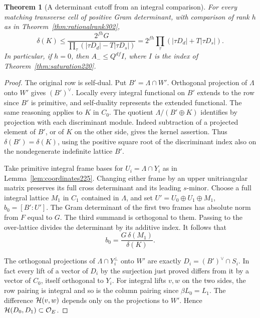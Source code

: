 \documentclass[a4paper,11pt]{article}
\newtheorem{theorem}[proposition]{Theorem}
\theoremstyle{definition}
\theoremstyle{remark}
\numberwithin{equation}{section}
\newcommand{\OO}{\mathcal O}
\begin{document}
\begin{theorem}[A determinant cutoff from an integral comparison]\leavevmode
\label{thm:agreement303}
For every matching transverse cell of positive Gram determinant,
with comparison of rank \(h\) as in Theorem~\ref{thm:rationalrank302},
\[
 \delta(K)\le
 \frac{2^{fh}G}{\prod_\tau (|\tau D_d|-T|\tau D_s|)}
     = 2^{fh}\prod_\tau (|\tau D_d|+T|\tau D_s|).
\]
In particular, if \(h=0\), then \(A_-\le Q^{df} I\), where
\(I\) is the index of Theorem~\ref{thm:saturation220}.
\end{theorem}
\begin{proof}
The original row is self-dual. Put \(B'=\Lambda\cap W'\).
Orthogonal projection of \(\Lambda\) onto \(W'\) gives
\((B')^\vee\). Locally every integral functional on \(B'\)
extends to the row since \(B'\) is primitive, and self-duality
represents the extended functional. The same reasoning
applies to \(K\) in \(C_0\). The quotient
\(\Lambda/(B'\oplus K)\) identifies by projection with each
discriminant module. Indeed subtraction of a projected
element of \(B'\), or of \(K\) on the other side, gives the
kernel assertion. Thus \(\delta(B')=\delta(K)\), using the
positive square root of the discriminant index also on the
nondegenerate indefinite lattice \(B'\).

Take primitive integral frame bases for
\(U_i=\Lambda\cap Y_i\) as in Lemma~\ref{lem:coordinates225}.
Changing either frame by an upper unitriangular matrix
preserves its full cross determinant and its leading
\(s\)-minor. Choose a full integral lattice \(M_1\) in
\(C_1\) contained in \(\Lambda\), and set
\(U'=U_0\oplus U_1\oplus M_1\), \(b_0=[B':U']\).
The Gram determinant of the first two frames has absolute
norm from \(F\) equal to \(G\). The third summand is
orthogonal to them. Passing to the over-lattice divides
the determinant by its additive index. It follows that
\[
                    b_0=\frac{G\,\delta(M_1)}{\delta(K)}.
\]

The orthogonal projections of \(\Lambda\cap Y_i^\perp\)
onto \(W'\) are exactly \(D_i=(B')^\vee\cap S_i\).
In fact every lift of a vector of \(D_i\) by the surjection
just proved differs from it by a vector of \(C_0\), itself
orthogonal to \(Y_i\). For integral lifts \(v,w\) on the
two sides, the row pairing is integral and so is the
column pairing since \(\beta L_0=L_1\).
The difference \({\cal H}(v,w)\) depends only on the
projections to \(W'\). Hence \({\cal H}(D_0,D_1)\subset\OO_E\).


\end{proof}
\end{document}
